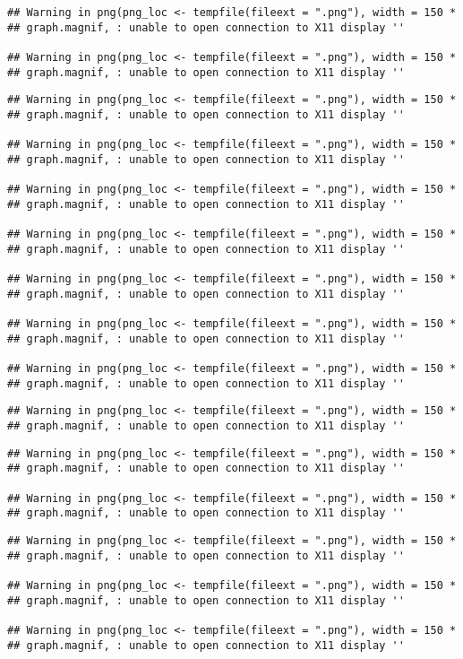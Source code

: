 \documentclass[]{article}
\begin{document}
\begin{verbatim}
## Warning in png(png_loc <- tempfile(fileext = ".png"), width = 150 *
## graph.magnif, : unable to open connection to X11 display ''

## Warning in png(png_loc <- tempfile(fileext = ".png"), width = 150 *
## graph.magnif, : unable to open connection to X11 display ''
\end{verbatim}

\begin{verbatim}
## Warning in png(png_loc <- tempfile(fileext = ".png"), width = 150 *
## graph.magnif, : unable to open connection to X11 display ''

## Warning in png(png_loc <- tempfile(fileext = ".png"), width = 150 *
## graph.magnif, : unable to open connection to X11 display ''

## Warning in png(png_loc <- tempfile(fileext = ".png"), width = 150 *
## graph.magnif, : unable to open connection to X11 display ''

## Warning in png(png_loc <- tempfile(fileext = ".png"), width = 150 *
## graph.magnif, : unable to open connection to X11 display ''

## Warning in png(png_loc <- tempfile(fileext = ".png"), width = 150 *
## graph.magnif, : unable to open connection to X11 display ''

## Warning in png(png_loc <- tempfile(fileext = ".png"), width = 150 *
## graph.magnif, : unable to open connection to X11 display ''

## Warning in png(png_loc <- tempfile(fileext = ".png"), width = 150 *
## graph.magnif, : unable to open connection to X11 display ''
\end{verbatim}

\begin{verbatim}
## Warning in png(png_loc <- tempfile(fileext = ".png"), width = 150 *
## graph.magnif, : unable to open connection to X11 display ''
\end{verbatim}

\begin{verbatim}
## Warning in png(png_loc <- tempfile(fileext = ".png"), width = 150 *
## graph.magnif, : unable to open connection to X11 display ''

## Warning in png(png_loc <- tempfile(fileext = ".png"), width = 150 *
## graph.magnif, : unable to open connection to X11 display ''
\end{verbatim}

\begin{verbatim}
## Warning in png(png_loc <- tempfile(fileext = ".png"), width = 150 *
## graph.magnif, : unable to open connection to X11 display ''

## Warning in png(png_loc <- tempfile(fileext = ".png"), width = 150 *
## graph.magnif, : unable to open connection to X11 display ''

## Warning in png(png_loc <- tempfile(fileext = ".png"), width = 150 *
## graph.magnif, : unable to open connection to X11 display ''
\end{verbatim}
\end{document}
